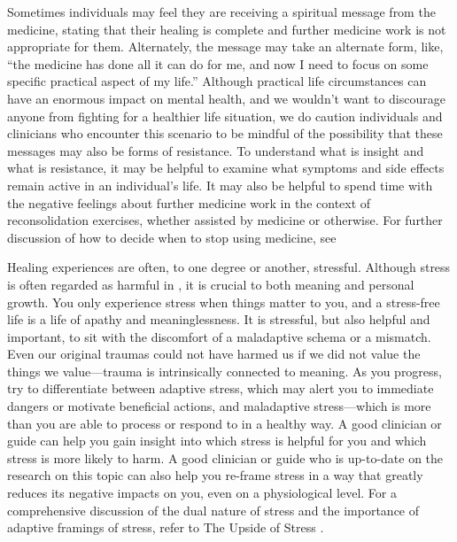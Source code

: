 \documentclass[12pt,letterpaper]{article}
\begin{document}
Sometimes individuals may feel they are receiving a spiritual message from the medicine, stating that their healing is complete and further medicine work is not appropriate for them. Alternately, the message may take an alternate form, like, “the medicine has done all it can do for me, and now I need to focus on some specific practical aspect of my life.”  Although practical life circumstances can have an enormous impact on mental health, and we wouldn't want to discourage anyone from fighting for a healthier life situation, we do caution individuals and clinicians who encounter this scenario to be mindful of the possibility that these messages may also be forms of resistance. To understand what is insight and what is resistance, it may be helpful to examine what symptoms and side effects remain active in an individual's life. It may also be helpful to spend time with the negative feelings about further medicine work in the context of reconsolidation exercises, whether assisted by medicine or otherwise. For further discussion of how to decide when to stop using medicine, see 

Healing experiences are often, to one degree or another, stressful. Although stress is often regarded as harmful in , it is crucial to both meaning and personal growth. You only experience stress when things matter to you, and a stress-free life is a life of apathy and meaninglessness. It is stressful, but also helpful and important, to sit with the discomfort of a maladaptive schema or a mismatch. Even our original traumas could not have harmed us if we did not value the things we value—trauma is intrinsically connected to meaning. As you progress, try to differentiate between adaptive stress, which may alert you to immediate dangers or motivate beneficial actions, and maladaptive stress—which is more than you are able to process or respond to in a healthy way. A good clinician or guide can help you gain insight into which stress is helpful for you and which stress is more likely to harm. A good clinician or guide who is up-to-date on the research on this topic can also help you re-frame stress in a way that greatly reduces its negative impacts on you, even on a physiological level. For a comprehensive discussion of the dual nature of stress and the importance of adaptive framings of stress, refer to The Upside of Stress \cite{mcgonigalStress}.
\end{document}
